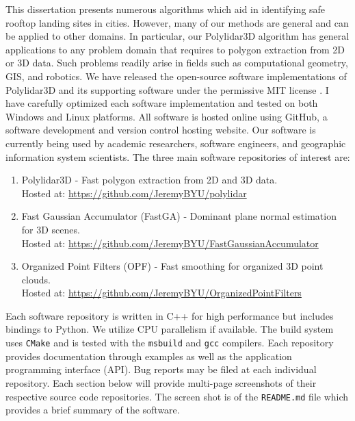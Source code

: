 
This dissertation presents numerous algorithms which aid in identifying safe rooftop landing sites in cities. However, many of our methods are general and can be applied to other domains. In particular, our Polylidar3D algorithm has general applications to any problem domain that requires to polygon extraction from 2D or 3D data. Such problems readily arise in fields such as computational geometry, \ac{GIS}, and robotics. We have released the open-source software implementations of Polylidar3D and its supporting software under the permissive MIT license \cite{saltzer_origin_2020}. I have carefully optimized each software implementation and tested on both Windows and Linux platforms. All software is hosted online using GitHub, a software development and version control hosting website. Our software is currently being used by academic researchers, software engineers, and geographic information system scientists.  The three main software repositories of interest are:

\begin{enumerate}
    \item Polylidar3D - Fast polygon extraction from 2D and 3D data. \\ Hosted at: \url{https://github.com/JeremyBYU/polylidar}
    \item Fast Gaussian Accumulator (FastGA) - Dominant plane normal estimation for 3D scenes. \\  Hosted at: \url{https://github.com/JeremyBYU/FastGaussianAccumulator}
    \item Organized Point Filters (OPF) - Fast smoothing for organized 3D point clouds.
    \\  Hosted at: \url{https://github.com/JeremyBYU/OrganizedPointFilters}
\end{enumerate}

Each software repository is written in C++ for high performance but includes bindings to Python. We utilize CPU parallelism if available. The build system uses \texttt{CMake} and is tested with the \texttt{msbuild} and \texttt{gcc} compilers. Each repository provides documentation through examples as well as the application programming interface (API). Bug reports may be filed at each individual repository. Each section below will provide multi-page screenshots of their respective source code repositories. The screen shot is of the \texttt{README.md} file which provides a brief summary of the software.






